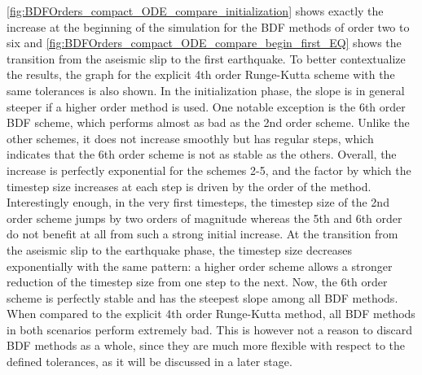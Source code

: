 \autoref{fig:BDFOrders_compact_ODE_compare_initialization} shows exactly the increase at the beginning of the simulation for the BDF methods of order two to six and \autoref{fig:BDFOrders_compact_ODE_compare_begin_first_EQ} shows the transition from the aseismic slip to the first earthquake. To better contextualize the results, the graph for the explicit 4th order Runge-Kutta scheme with the same tolerances is also shown. In the initialization phase, the slope is in general steeper if a higher order method is used. One notable exception is the 6th order BDF scheme, which performs almost as bad as the 2nd order scheme. Unlike the other schemes, it does not increase smoothly but has regular steps, which indicates that the 6th order scheme is not as stable as the others. Overall, the increase is perfectly exponential for the schemes 2-5, and the factor by which the timestep size increases at each step is driven by the order of the method. Interestingly enough, in the very first timesteps,  the timestep size of the 2nd order scheme jumps by two orders of magnitude whereas the 5th and 6th order do not benefit at all from such a strong initial increase. At the transition from the aseismic slip to the earthquake phase, the timestep size decreases exponentially with the same pattern: a higher order scheme allows a stronger reduction of the timestep size from one step to the next. Now, the 6th order scheme is perfectly stable and has the steepest slope among all BDF methods. When compared to the explicit 4th order Runge-Kutta method, all BDF methods in both scenarios perform extremely bad. This is however not a reason to discard BDF methods as a whole, since they are much more flexible with respect to the defined tolerances, as it will be discussed in a later stage.

